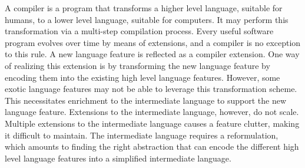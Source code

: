 \documentclass[screen,nonacm]{acmart}
\begin{document}
A compiler is a program that transforms a higher level language, suitable for
humans, to a lower level language, suitable for computers. It may
perform this transformation via a multi-step compilation
process\cite{essentials_siek_2023}. Every useful software program
evolves over time by means of extensions, and a compiler is no
exception to this rule. A new language feature is reflected as
a compiler extension. One way of realizing this extension is by
transforming the new language feature by encoding them
into the existing high level language features. However, some exotic
language features may not be able to leverage this transformation
scheme. This necessitates enrichment to the intermediate language to
support the new language feature. Extensions to the intermediate
language, however, do not scale. Multiple extensions to the
intermediate language causes a feature clutter, making it difficult to
maintain. The intermediate language requires a reformulation,
which amounts to finding the right abstraction that can encode the different high
level language features into a simplified intermediate language.
\end{document}
